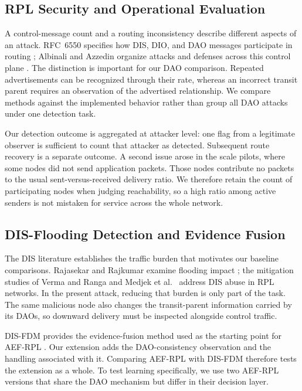 \documentclass[journal]{IEEEtran}
\begin{document}
\subsection{RPL Security and Operational Evaluation}
A control-message count and a routing inconsistency describe different aspects of an attack. RFC~6550 specifies how DIS, DIO, and DAO messages participate in routing \cite{rfc6550}; Albinali and Azzedin organize attacks and defenses across this control plane \cite{albinali2024}. The distinction is important for our DAO comparison. Repeated advertisements can be recognized through their rate, whereas an incorrect transit parent requires an observation of the advertised relationship. We compare methods against the implemented behavior rather than group all DAO attacks under one detection task.

Our detection outcome is aggregated at attacker level: one flag from a legitimate observer is sufficient to count that attacker as detected. Subsequent route recovery is a separate outcome. A second issue arose in the scale pilots, where some nodes did not send application packets. Those nodes contribute no packets to the usual sent-versus-received delivery ratio. We therefore retain the count of participating nodes when judging reachability, so a high ratio among active senders is not mistaken for service across the whole network.

\subsection{DIS-Flooding Detection and Evidence Fusion}
The DIS literature establishes the traffic burden that motivates our baseline comparisons. Rajasekar and Rajkumar examine flooding impact \cite{rajasekar2022}; the mitigation studies of Verma and Ranga \cite{vermaranga2020} and Medjek et al.\ \cite{medjek2021} address DIS abuse in RPL networks. In the present attack, reducing that burden is only part of the task. The same malicious node also changes the transit-parent information carried by its DAOs, so downward delivery must be inspected alongside control traffic.

DIS-FDM provides the evidence-fusion method used as the starting point for AEF-RPL \cite{prajisha2025}. Our extension adds the DAO-consistency observation and the handling associated with it. Comparing AEF-RPL with DIS-FDM therefore tests the extension as a whole. To test learning specifically, we use two AEF-RPL versions that share the DAO mechanism but differ in their decision layer.
\end{document}

